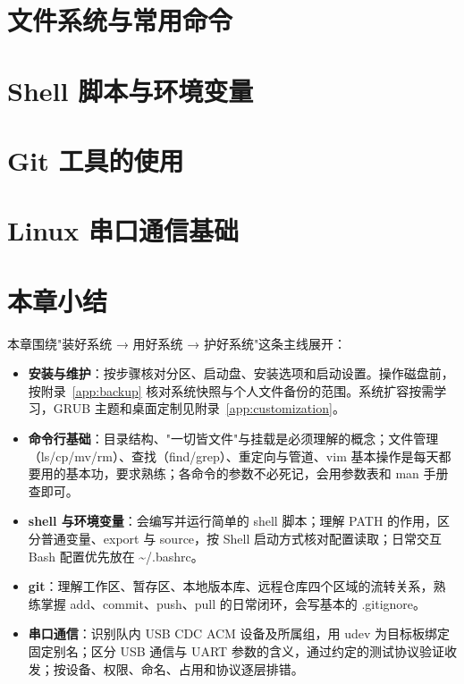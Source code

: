 \documentclass[
  lang=cn,
  scheme=chinese,
  chinesefont=ctexfont,
  11pt,
  oneside,
  device=normal,
  color=cyan,
  mode=fancy
]{../templates/elegantbook}
\begin{document}
\section{文件系统与常用命令}


\section{Shell 脚本与环境变量}


\section{Git 工具的使用}


\section{Linux 串口通信基础}


\section{本章小结}
本章围绕"装好系统 → 用好系统 → 护好系统"这条主线展开：

\begin{itemize}
\item \textbf{安装与维护}：按步骤核对分区、启动盘、安装选项和启动设置。操作磁盘前，按附录~\ref{app:backup} 核对系统快照与个人文件备份的范围。系统扩容按需学习，GRUB 主题和桌面定制见附录~\ref{app:customization}。
\item \textbf{命令行基础}：目录结构、"一切皆文件"与挂载是必须理解的概念；文件管理（ls/cp/mv/rm）、查找（find/grep）、重定向与管道、vim 基本操作是每天都要用的基本功，要求熟练；各命令的参数不必死记，会用参数表和 man 手册查即可。
\item \textbf{shell 与环境变量}：会编写并运行简单的 shell 脚本；理解 PATH 的作用，区分普通变量、export 与 source，按 Shell 启动方式核对配置读取；日常交互 Bash 配置优先放在 \textasciitilde/.bashrc。
\item \textbf{git}：理解工作区、暂存区、本地版本库、远程仓库四个区域的流转关系，熟练掌握 add、commit、push、pull 的日常闭环，会写基本的 .gitignore。
\item \textbf{串口通信}：识别队内 USB CDC ACM 设备及所属组，用 udev 为目标板绑定固定别名；区分 USB 通信与 UART 参数的含义，通过约定的测试协议验证收发；按设备、权限、命名、占用和协议逐层排错。
\end{itemize}
\end{document}
